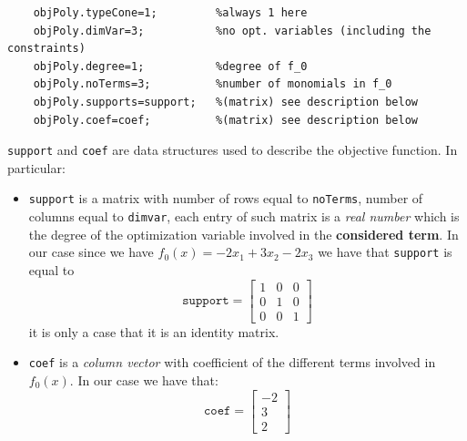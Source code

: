 \begin{verbatim}
    objPoly.typeCone=1;         %always 1 here
    objPoly.dimVar=3;           %no opt. variables (including the constraints)
    objPoly.degree=1;           %degree of f_0
    objPoly.noTerms=3;          %number of monomials in f_0
    objPoly.supports=support;   %(matrix) see description below
    objPoly.coef=coef;          %(matrix) see description below         
\end{verbatim}
\texttt{support} and \texttt{coef} are data structures used to describe the objective function. In particular: 
\begin{itemize}
    \item \texttt{support} is a matrix with number of rows equal to \texttt{noTerms}, number of columns equal to \texttt{dimvar}, each entry of such matrix is a \textit{real number} which is the degree of the optimization variable involved in the \textbf{considered term}. In our case since we have ${f_0(x) = -2x_1+ 3x_2 -2 x_3}$ we have that \texttt{support} is equal to
    \begin{equation*}
        \texttt{support} = \begin{bmatrix}
            1&0&0\\
            0&1&0\\
            0&0&1
        \end{bmatrix}
    \end{equation*}
    it is only a case that it is an identity matrix.
    \item \texttt{coef} is a \textit{column vector} with coefficient of the different terms involved in $f_0(x)$. In our case we have that: 
    \begin{equation*}
        \texttt{coef} = \begin{bmatrix}
            -2\\3\\2
        \end{bmatrix}
    \end{equation*}
\end{itemize}

